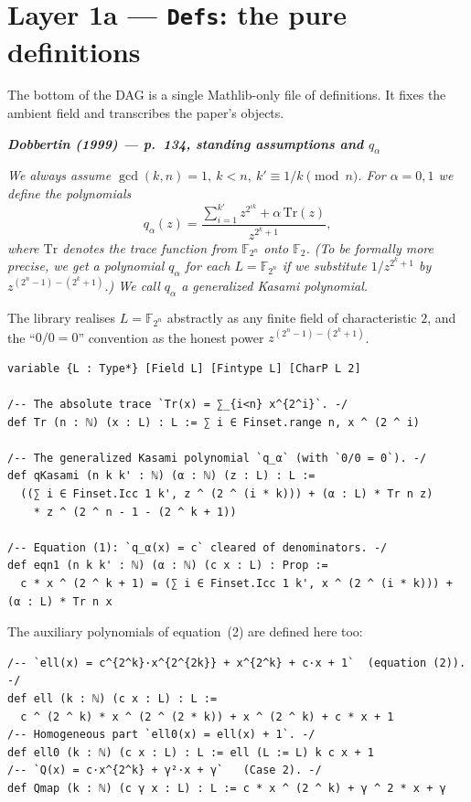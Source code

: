 \documentclass[11pt]{article}
\newenvironment{paperquote}[1]
 {\par\smallskip\noindent
  \def\FrameCommand{\color{quotebar}\vrule width 3pt\hspace{8pt}}%
  \MakeFramed{\advance\hsize-\width \FrameRestore}%
  \small\itshape
  \noindent\normalfont\footnotesize\textbf{\textsf{Dobbertin (1999) --- #1}}\par\nobreak\smallskip\itshape}
 {\endMakeFramed\par\smallskip}
\theoremstyle{definition}
\begin{document}
\clearpage

\section{Layer 1a --- \texttt{Defs}: the pure definitions}

The bottom of the DAG is a single Mathlib-only file of definitions.  It fixes
the ambient field and transcribes the paper's objects.

\begin{paperquote}{p.~134, standing assumptions and $q_\alpha$}
We always assume $\gcd(k,n)=1,\ k<n,\ k'\equiv 1/k \pmod n$. For
$\alpha=0,1$ we define the polynomials
\[
  q_\alpha(z)=\frac{\sum_{i=1}^{k'} z^{2^{ik}}+\alpha\,\mathrm{Tr}(z)}{z^{2^k+1}},
\]
where $\mathrm{Tr}$ denotes the trace function from $\mathbb{F}_{2^n}$ onto
$\mathbb{F}_2$. (To be formally more precise, we get a polynomial $q_\alpha$ for
each $L=\mathbb{F}_{2^n}$ if we substitute $1/z^{2^k+1}$ by
$z^{(2^n-1)-(2^k+1)}$.) We call $q_\alpha$ a generalized Kasami polynomial.
\end{paperquote}

The library realises $L=\mathbb{F}_{2^n}$ abstractly as any finite field of
characteristic $2$, and the ``$0/0=0$'' convention as the honest power
$z^{(2^n-1)-(2^k+1)}$.

\begin{lstlisting}
variable {L : Type*} [Field L] [Fintype L] [CharP L 2]

/-- The absolute trace `Tr(x) = ∑_{i<n} x^{2^i}`. -/
def Tr (n : ℕ) (x : L) : L := ∑ i ∈ Finset.range n, x ^ (2 ^ i)

/-- The generalized Kasami polynomial `q_α` (with `0/0 = 0`). -/
def qKasami (n k k' : ℕ) (α : ℕ) (z : L) : L :=
  ((∑ i ∈ Finset.Icc 1 k', z ^ (2 ^ (i * k))) + (α : L) * Tr n z)
    * z ^ (2 ^ n - 1 - (2 ^ k + 1))

/-- Equation (1): `q_α(x) = c` cleared of denominators. -/
def eqn1 (n k k' : ℕ) (α : ℕ) (c x : L) : Prop :=
  c * x ^ (2 ^ k + 1) = (∑ i ∈ Finset.Icc 1 k', x ^ (2 ^ (i * k))) + (α : L) * Tr n x
\end{lstlisting}

The auxiliary polynomials of equation~(2) are defined here too:

\begin{lstlisting}
/-- `ell(x) = c^{2^k}·x^{2^{2k}} + x^{2^k} + c·x + 1`  (equation (2)). -/
def ell (k : ℕ) (c x : L) : L :=
  c ^ (2 ^ k) * x ^ (2 ^ (2 * k)) + x ^ (2 ^ k) + c * x + 1
/-- Homogeneous part `ell0(x) = ell(x) + 1`. -/
def ell0 (k : ℕ) (c x : L) : L := ell (L := L) k c x + 1
/-- `Q(x) = c·x^{2^k} + γ²·x + γ`   (Case 2). -/
def Qmap (k : ℕ) (c γ x : L) : L := c * x ^ (2 ^ k) + γ ^ 2 * x + γ
\end{lstlisting}
\end{document}
